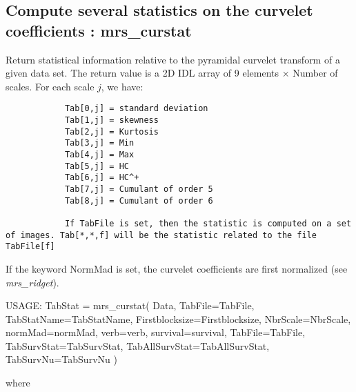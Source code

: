 \subsection{Compute several statistics on the curvelet coefficients : mrs\_curstat}
Return statistical information relative to the pyramidal curvelet transform of a given data set.
The return value is a 2D IDL array of 9 elements $\times$ Number of scales. For each scale $j$, we have:
\begin{verbatim}
			Tab[0,j] = standard deviation
			Tab[1,j] = skewness
			Tab[2,j] = Kurtosis
			Tab[3,j] = Min
			Tab[4,j] = Max 
			Tab[5,j] = HC
			Tab[6,j] = HC^+
			Tab[7,j] = Cumulant of order 5
			Tab[8,j] = Cumulant of order 6

			If TabFile is set, then the statistic is computed on a set of images. Tab[*,*,f] will be the statistic related to the file TabFile[f]
\end{verbatim}
If the keyword NormMad is set, the curvelet coefficients are first normalized (see {\em mrs\_ridget}).
{\bf
\begin{center}
     USAGE: TabStat = mrs\_curstat( Data, TabFile=TabFile, TabStatName=TabStatName, Firstblocksize=Firstblocksize, NbrScale=NbrScale, normMad=normMad, 
     verb=verb, survival=survival, TabFile=TabFile, TabSurvStat=TabSurvStat, TabAllSurvStat=TabAllSurvStat, TabSurvNu=TabSurvNu )  
\end{center}}
where 
